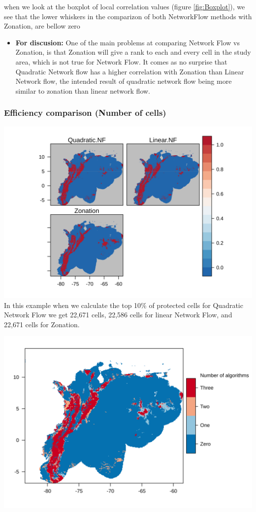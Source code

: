 \documentclass[]{article}
\providecommand{\tightlist}{%
  \setlength{\itemsep}{0pt}\setlength{\parskip}{0pt}}
\begin{document}
when we look at the boxplot of local correlation values (figure \ref{fig:Boxplot}), we see that the lower whiskers in the comparizon of both NetworkFlow methods with Zonation, are bellow zero

\begin{itemize}
\tightlist
\item
  \textbf{For discusion:} One of the main problems at comparing Network Flow vs Zonation, is that Zonation will give a rank to each and every cell in the study area, which is not true for Network Flow. It comes as no surprise that Quadratic Network flow has a higher correlation with Zonation than Linear Network flow, the intended result of quadratic network flow being more similar to zonation than linear network flow.
\end{itemize}

\hypertarget{efficiency-comparison-number-of-cells}{%
\subsubsection{Efficiency comparison (Number of cells)}\label{efficiency-comparison-number-of-cells}}

\includegraphics{NFPaper_files/figure-latex/unnamed-chunk-5-1.png}
In this example when we calculate the top 10\% of protected cells for Quadratic Network Flow we get 22,671 cells, 22,586 cells for linear Network Flow, and 22,671 cells for Zonation.

\includegraphics{NFPaper_files/figure-latex/unnamed-chunk-6-1.png}
\end{document}
